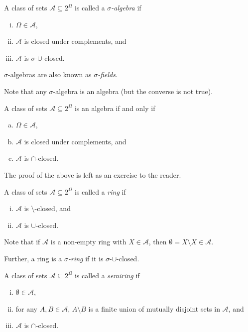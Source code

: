 \vspace{2mm}
\begin{definition}
\label{defSigAlgebra}
    A class of sets $\mathcal{A}\subseteq 2^\Omega$ is called a \textit{$\sigma$-algebra} if
    \begin{enumerate}[(i)]
        \item $\Omega\in\mathcal{A}$,
        \item $\mathcal{A}$ is closed under complements, and
        \item $\mathcal{A}$ is $\sigma$-$\cup$-closed.
    \end{enumerate}
\end{definition}

$\sigma$-algebras are also known as \textit{$\sigma$-fields}.

Note that any $\sigma$-algebra is an algebra (but the converse is not true).

\begin{theorem}
\label{algebra iff conditions}
    A class of sets $\mathcal{A}\subseteq2^\Omega$ is an algebra if and only if
    \begin{enumerate}[(a)]
        \item $\Omega\in\mathcal{A}$,
        \item $\mathcal{A}$ is closed under complements, and
        \item $\mathcal{A}$ is $\cap$-closed.
    \end{enumerate}
\end{theorem}

The proof of the above is left as an exercise to the reader.

\begin{definition}[Ring]
\label{defRing}
    A class of sets $\mathcal{A}\subseteq2^\Omega$ is called a \textit{ring} if
    \begin{enumerate}[(i)]
        \item $\mathcal{A}$ is $\setminus$-closed, and
        \item $\mathcal{A}$ is $\cup$-closed.
    \end{enumerate}
\end{definition}

Note that if $\mathcal{A}$ is a non-empty ring with $X\in\mathcal{A}$, then $\emptyset=X\setminus X\in\mathcal{A}$.

Further, a ring is a \textit{$\sigma$-ring} if it is $\sigma$-$\cup$-closed.

\begin{definition}[Semiring]
\label{defSemiring}
    A class of sets $\mathcal{A}\subseteq2^\Omega$ is called a \textit{semiring} if
    \begin{enumerate}[(i)]
        \item $\emptyset\in\mathcal{A}$, 
        \item for any $A,B\in\mathcal{A}$, $A\setminus B$ is a finite union of mutually disjoint sets in $\mathcal{A}$, and
        \item $\mathcal{A}$ is $\cap$-closed.
    \end{enumerate}
\end{definition}

